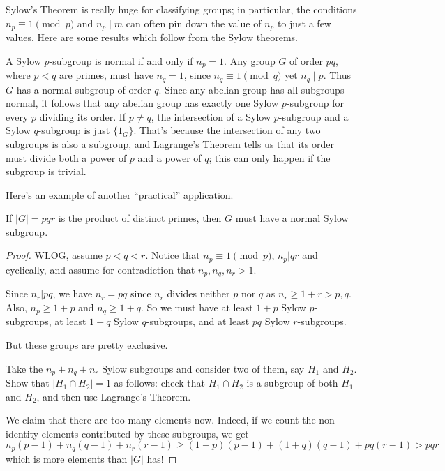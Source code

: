 Sylow's Theorem is really huge for classifying groups;
in particular, the conditions $n_p \equiv 1 \pmod p$ and $n_p \mid m$
can often pin down the value of $n_p$ to just a few values.
Here are some results which follow from the Sylow theorems.
\begin{itemize}
	\ii A Sylow $p$-subgroup is normal if and only if $n_p = 1$.
	\ii Any group $G$ of order $pq$, where $p < q$ are primes,
	must have $n_q = 1$, since $n_q \equiv 1 \pmod q$ yet $n_q \mid p$.
	Thus $G$ has a normal subgroup of order $q$.
	\ii Since any abelian group has all subgroups normal,
	it follows that any abelian group has exactly one Sylow $p$-subgroup
	for every $p$ dividing its order.
	\ii If $p \neq q$, the intersection of a Sylow $p$-subgroup and a Sylow $q$-subgroup is just $\{1_G\}$.
	That's because the intersection of any two subgroups is also a subgroup,
	and Lagrange's Theorem tells us that its order must divide both a power of $p$
	and a power of $q$; this can only happen if the subgroup is trivial.
\end{itemize}

Here's an example of another ``practical'' application.
\begin{proposition}
	If $\left\lvert G \right\rvert = pqr$ is the product of distinct primes,
	then $G$ must have a normal Sylow subgroup.
\end{proposition}
\begin{proof}
	WLOG, assume $p<q<r$.  Notice that $n_p \equiv 1 \pmod p$, $n_p | qr$ and cyclically, and assume for contradiction that $n_p, n_q, n_r > 1$.
	
	Since $n_r | pq$, we have $n_r = pq$ since $n_r$ divides neither $p$ nor $q$ as $n_r \ge 1 + r > p,q$.  Also, $n_p \ge 1+p$ and $n_q \ge 1+q$.
	So we must have at least $1+p$ Sylow $p$-subgroups,
	at least $1+q$ Sylow $q$-subgroups, and at least $pq$ Sylow $r$-subgroups.

	But these groups are pretty exclusive.
	\begin{ques}
		Take the $n_p+n_q+n_r$ Sylow subgroups and consider two of them, 
		say $H_1$ and $H_2$.
		Show that $\left\lvert H_1 \cap H_2 \right\rvert = 1$
		as follows:
		check that $H_1 \cap H_2$ is a subgroup of both $H_1$ and $H_2$,
		and then use Lagrange's Theorem.
	\end{ques}

	We claim that there are too many elements now.
	Indeed, if we count the non-identity elements contributed by these subgroups, we get
	\[ n_p(p-1) + n_q(q-1) + n_r(r-1)
		\ge (1+p)(p-1) + (1+q)(q-1) + pq(r-1) > pqr 
	\]
	which is more elements than $\left\lvert G \right\rvert$ has!
\end{proof}


